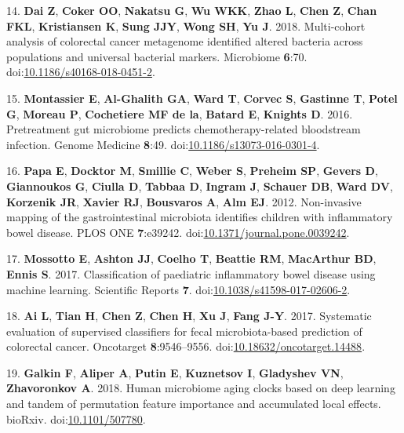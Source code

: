 \documentclass[11pt,]{article}
\begin{document}
\hypertarget{ref-dai_multi-cohort_2018}{}
14. \textbf{Dai Z}, \textbf{Coker OO}, \textbf{Nakatsu G}, \textbf{Wu
WKK}, \textbf{Zhao L}, \textbf{Chen Z}, \textbf{Chan FKL},
\textbf{Kristiansen K}, \textbf{Sung JJY}, \textbf{Wong SH}, \textbf{Yu
J}. 2018. Multi-cohort analysis of colorectal cancer metagenome
identified altered bacteria across populations and universal bacterial
markers. Microbiome \textbf{6}:70.
doi:\href{https://doi.org/10.1186/s40168-018-0451-2}{10.1186/s40168-018-0451-2}.

\hypertarget{ref-montassier_pretreatment_2016}{}
15. \textbf{Montassier E}, \textbf{Al-Ghalith GA}, \textbf{Ward T},
\textbf{Corvec S}, \textbf{Gastinne T}, \textbf{Potel G}, \textbf{Moreau
P}, \textbf{Cochetiere MF de la}, \textbf{Batard E}, \textbf{Knights D}.
2016. Pretreatment gut microbiome predicts chemotherapy-related
bloodstream infection. Genome Medicine \textbf{8}:49.
doi:\href{https://doi.org/10.1186/s13073-016-0301-4}{10.1186/s13073-016-0301-4}.

\hypertarget{ref-papa_non-invasive_2012}{}
16. \textbf{Papa E}, \textbf{Docktor M}, \textbf{Smillie C},
\textbf{Weber S}, \textbf{Preheim SP}, \textbf{Gevers D},
\textbf{Giannoukos G}, \textbf{Ciulla D}, \textbf{Tabbaa D},
\textbf{Ingram J}, \textbf{Schauer DB}, \textbf{Ward DV},
\textbf{Korzenik JR}, \textbf{Xavier RJ}, \textbf{Bousvaros A},
\textbf{Alm EJ}. 2012. Non-invasive mapping of the gastrointestinal
microbiota identifies children with inflammatory bowel disease. PLOS ONE
\textbf{7}:e39242.
doi:\href{https://doi.org/10.1371/journal.pone.0039242}{10.1371/journal.pone.0039242}.

\hypertarget{ref-mossotto_classification_2017}{}
17. \textbf{Mossotto E}, \textbf{Ashton JJ}, \textbf{Coelho T},
\textbf{Beattie RM}, \textbf{MacArthur BD}, \textbf{Ennis S}. 2017.
Classification of paediatric inflammatory bowel disease using machine
learning. Scientific Reports \textbf{7}.
doi:\href{https://doi.org/10.1038/s41598-017-02606-2}{10.1038/s41598-017-02606-2}.

\hypertarget{ref-ai_systematic_2017}{}
18. \textbf{Ai L}, \textbf{Tian H}, \textbf{Chen Z}, \textbf{Chen H},
\textbf{Xu J}, \textbf{Fang J-Y}. 2017. Systematic evaluation of
supervised classifiers for fecal microbiota-based prediction of
colorectal cancer. Oncotarget \textbf{8}:9546--9556.
doi:\href{https://doi.org/10.18632/oncotarget.14488}{10.18632/oncotarget.14488}.

\hypertarget{ref-galkin_human_2018}{}
19. \textbf{Galkin F}, \textbf{Aliper A}, \textbf{Putin E},
\textbf{Kuznetsov I}, \textbf{Gladyshev VN}, \textbf{Zhavoronkov A}.
2018. Human microbiome aging clocks based on deep learning and tandem of
permutation feature importance and accumulated local effects. bioRxiv.
doi:\href{https://doi.org/10.1101/507780}{10.1101/507780}.
\end{document}
